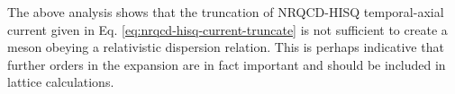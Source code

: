 The above analysis shows that the truncation of NRQCD-HISQ temporal-axial current given in Eq. \eqref{eq:nrqcd-hisq-current-truncate} is not sufficient to create a meson obeying a relativistic dispersion relation. This is perhaps indicative that further orders in the expansion are in fact important and should be included in lattice calculations. 



